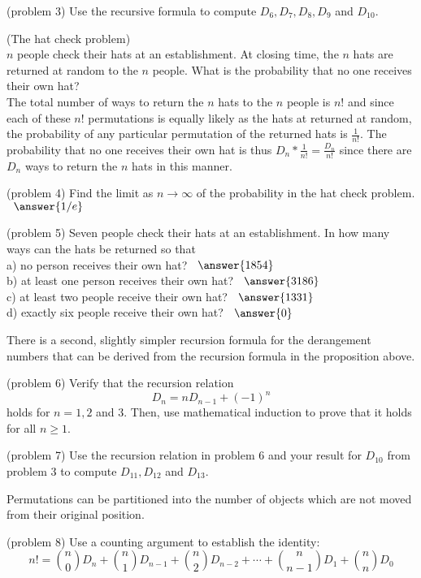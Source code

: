 \documentclass[handout]{ximera}
\begin{document}
\begin{problem}(problem 3)
Use the recursive formula to compute $D_6, D_7, D_8, D_9$ and $D_{10}$.
\end{problem}

\begin{example}[example 4] (The hat check problem)\\
$n$ people check their hats at an establishment. At closing time, the $n$ hats are returned at random to the $n$ people.
What is the probability that no one receives their own hat?\\
The total number of ways to return the $n$ hats to the $n$ people is $n!$ and since each of 
these $n!$ permutations is equally likely as the hats at returned at random, the probability of 
any particular permutation of the returned hats is $\frac{1}{n!}$. The probability that no one 
receives their own hat is thus $D_n*\frac{1}{n!} = \frac{D_n}{n!}$ since there are $D_n$ ways to return 
the $n$ hats in this manner.
\end{example}

\begin{problem}(problem 4)
Find the limit as $n \to \infty$ of the probability in the hat check problem. $\;\; \answer{1/e}$
\end{problem}

\begin{problem}(problem 5)
Seven people check their hats at an establishment. In how many ways can the hats be returned so that \\
a) no person receives their own hat? $\;\; \answer{1854}$\\
b) at least one person receives their own hat? $\;\; \answer{3186}$\\
c) at least two people receive their own hat? $\;\; \answer{1331}$\\
d) exactly six people receive their own hat? $\;\; \answer{0}$\\
\end{problem}

There is a second, slightly simpler recursion formula for the derangement numbers that can be derived from the recursion 
formula in the proposition above.

\begin{problem}(problem 6)
Verify that the recursion relation
\[
D_n = nD_{n-1} + (-1)^n
\]
holds for $n=1, 2$ and $3$. Then, use mathematical induction to prove that it holds for all $n \geq 1$.
\end{problem}

\begin{problem}(problem 7)
Use the recursion relation in problem 6 and your result for $D_{10}$ from problem 3 to compute $D_{11}, D_{12}$
and $D_{13}$.
\end{problem}


Permutations can be partitioned into the number of objects which are not moved from their original position.

\begin{problem}(problem 8)
Use a counting argument to establish the identity:
\[
n! = \binom{n}{0} D_n + \binom{n}{1} D_{n-1}  +\binom{n}{2} D_{n-2} + \cdots +\binom{n}{n-1} D_{1}+\binom{n}{n} D_0
\]
\end{problem}
\end{document}

